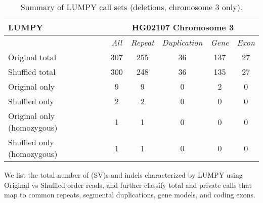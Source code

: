 \begin{table}[htb]
\caption{ Summary of LUMPY call sets (deletions, chromosome 3 only). }
\begin{center}
\begin{tabular}{|l|c||c|c|c|c|}
\hline
{\bf LUMPY} & \multicolumn{5}{|c|}{\bf HG02107 Chromosome 3} \\
\hline
\cline{2-6}
{\bf} & {\it All} & {\it Repeat} & {\it Duplication} & {\it Gene} & {\it Exon} \\
\hline
Original total & 307 & 255 & 36 & 137 & 27 \\
\hline
Shuffled total & 300 & 248 & 36 & 135 & 27 \\
\hline
Original only & 9 & 9 & 0 & 2 & 0\\ 
\hline
Shuffled only & 2 & 2 & 0 & 0 & 0 \\
\hline
Original only (homozygous) & 1 & 1 & 0 & 0 & 0\\ 
\hline
Shuffled only (homozygous) & 1 & 1 & 0 & 0 & 0\\  
\hline
\end{tabular}
\end{center}
{\footnotesize We list the total number of (SV)s and indels characterized by LUMPY using Original vs Shuffled order reads, 
and further classify total and private calls that map to common repeats, segmental duplications, gene models, and coding exons.}
\label{supptab:orig-vs-shuf-lumpy}
\end{table}

